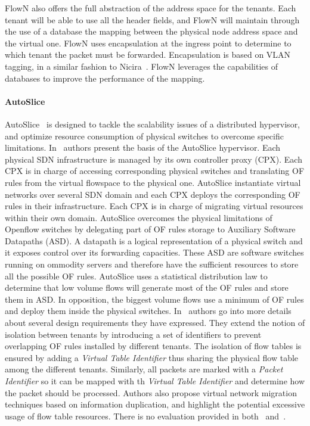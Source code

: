FlowN also offers the full abstraction of the address space for the tenants.
Each tenant will be able to use all the header fields, and FlowN will maintain through the use of a database the mapping between the physical node address space and the virtual one. FlowN uses encapsulation at the ingress point to determine to which tenant the packet must be forwarded. Encapsulation is based on VLAN tagging, in a similar fashion to Nicira~\cite{nicira}.   
FlowN leverages the capabilities of databases to improve the performance of the mapping.



\paragraph{AutoSlice}
AutoSlice~\cite{AutoSlice-Bozakov2012} is designed to tackle the scalability issues of a distributed hypervisor, and optimize resource consumption of physical switches to overcome specific limitations.
In~\cite{AutoSlice-Bozakov2012} authors present the basis of the AutoSlice hypervisor.
Each physical SDN infrastructure is managed by its own controller proxy (CPX).
Each CPX is in charge of accessing corresponding physical switches and translating OF rules from the virtual flowspace to the physical one.
AutoSlice instantiate virtual networks over several SDN domain and each CPX deploys the corresponding OF rules in their infrastructure.
Each CPX is in charge of migrating virtual resources within their own domain.
AutoSlice overcomes the physical limitations of Openflow switches by delegating part of OF rules storage to Auxiliary Software Datapaths (ASD).
A datapath is a logical representation of a physical switch and it exposes control over its forwarding capacities.
These ASD are software switches running on ommodity servers and therefore have the sufficient resources to store all the possible OF rules.
AutoSlice uses a statistical distribution law to determine that low volume flows will generate most of the OF rules and store them in ASD. In opposition, the biggest volume flows use a minimum of OF rules and deploy them inside the physical switches.
In~\cite{AutoSlice2-Bozakov2014} authors go into more details about several design requirements they have expressed. They extend the notion of isolation between tenants by introducing a set of identifiers to prevent overlapping OF rules installed by different tenants.
The isolation of flow tables is ensured by adding a \textit{Virtual Table Identifier} thus sharing the physical flow table among the different tenants.
Similarly, all packets are marked with a \textit{Packet Identifier} so it can be mapped with th \textit{Virtual Table Identifier} and determine how the packet should be processed.
Authors also propose virtual network migration techniques based on information duplication, and highlight the potential excessive usage of flow table resources.
There is no evaluation provided in both~\cite{AutoSlice-Bozakov2012} and~\cite{AutoSlice2-Bozakov2014}.


